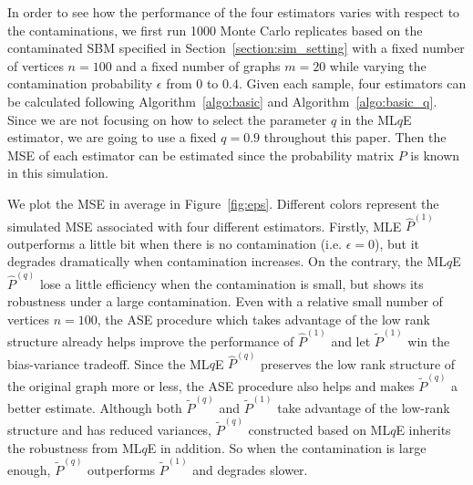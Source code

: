 \documentclass[a4paper]{article}
\renewcommand{\hat}{\widehat}
\begin{document}
In order to see how the performance of the four estimators varies with respect to the contaminations, we first run 1000 Monte Carlo replicates based on the contaminated SBM specified in Section~\ref{section:sim_setting} with a fixed number of vertices $n = 100$ and a fixed number of graphs $m = 20$ while varying the contamination probability $\epsilon$ from $0$ to $0.4$.
Given each sample, four estimators can be calculated following Algorithm~\ref{algo:basic} and Algorithm~\ref{algo:basic_q}. Since we are not focusing on how to select the parameter $q$ in the ML$q$E estimator, we are going to use a fixed $q = 0.9$ throughout this paper. Then the MSE of each estimator can be estimated since the probability matrix $P$ is known in this simulation.

We plot the MSE in average in Figure~\ref{fig:eps}. Different colors represent the simulated MSE associated with four different estimators.
Firstly, MLE $\hat{P}^{(1)}$ outperforms a little bit when there is no contamination (i.e. $\epsilon = 0$), but it degrades dramatically when contamination increases. On the contrary, the ML$q$E $\hat{P}^{(q)}$ lose a little efficiency when the contamination is small, but shows its robustness under a large contamination.
Even with a relative small number of vertices $n = 100$, the ASE procedure which takes advantage of the low rank structure already helps improve the performance of $\hat{P}^{(1)}$ and let $\widetilde{P}^{(1)}$ win the bias-variance tradeoff. Since the ML$q$E $\hat{P}^{(q)}$ preserves the low rank structure of the original graph more or less, the ASE procedure also helps and makes $\widetilde{P}^{(q)}$ a better estimate. Although both $\widetilde{P}^{(q)}$ and $\widetilde{P}^{(1)}$ take advantage of the low-rank structure and has reduced variances, $\widetilde{P}^{(q)}$ constructed based on ML$q$E inherits the robustness from ML$q$E in addition. So when the contamination is large enough, $\widetilde{P}^{(q)}$ outperforms $\widetilde{P}^{(1)}$ and degrades slower.
\end{document}
